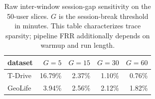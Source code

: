 \begin{table}[t]
\centering
\caption{Raw inter-window session-gap sensitivity on the 50-user slices.
$G$ is the session-break threshold in minutes. This table characterizes
trace sparsity; pipeline FRR additionally depends on warmup and run length.}
\label{tab:session-gap}
\scriptsize
\setlength{\tabcolsep}{3pt}
\begin{tabular}{@{}l r r r r@{}}
\toprule
dataset & $G{=}5$ & $G{=}15$ & $G{=}30$ & $G{=}60$ \\
\midrule
T-Drive & 16.79\% & 2.37\% & 1.10\% & 0.76\% \\
GeoLife & 3.94\% & 2.56\% & 2.12\% & 1.82\% \\
\bottomrule
\end{tabular}
\end{table}
